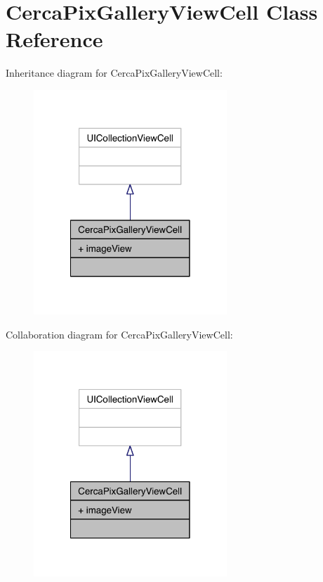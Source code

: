 \hypertarget{interface_cerca_pix_gallery_view_cell}{\section{Cerca\-Pix\-Gallery\-View\-Cell Class Reference}
\label{interface_cerca_pix_gallery_view_cell}
}


Inheritance diagram for Cerca\-Pix\-Gallery\-View\-Cell\-:\nopagebreak
\begin{figure}[H]
\begin{center}
\leavevmode
\includegraphics[width=206pt]{interface_cerca_pix_gallery_view_cell__inherit__graph}
\end{center}
\end{figure}


Collaboration diagram for Cerca\-Pix\-Gallery\-View\-Cell\-:\nopagebreak
\begin{figure}[H]
\begin{center}
\leavevmode
\includegraphics[width=206pt]{interface_cerca_pix_gallery_view_cell__coll__graph}
\end{center}
\end{figure}
